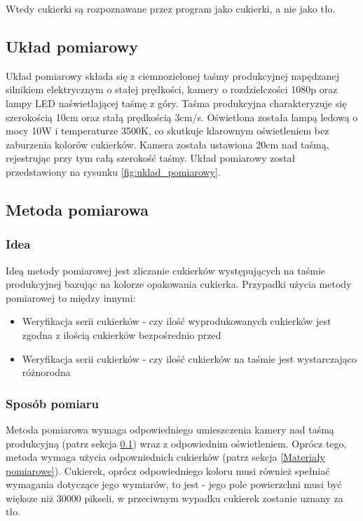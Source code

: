 \documentclass{article}
\begin{document}
Wtedy cukierki są rozpoznawane przez program jako cukierki, a nie jako tło.

\subsection{Układ pomiarowy}
\label{Układ pomiarowy}

Układ pomiarowy składa się z ciemnozielonej taśmy produkcyjnej napędzanej silnikiem elektrycznym o stałej prędkości, kamery o rozdzielczości 1080p oraz lampy LED naświetlającej taśmę z góry.
Taśma produkcyjna charakteryzuje się szerokością 10cm oraz stałą prędkością 3cm/s. Oświetlona została lampą ledową o mocy 10W i temperaturze 3500K, co skutkuje klarownym oświetleniem bez zaburzenia kolorów cukierków.
Kamera została ustawiona 20cm nad taśmą, rejestrując przy tym całą szerokość taśmy.
Układ pomiarowy został przedstawiony na rysunku \ref{fig:uklad_pomiarowy}.

\subsection{Metoda pomiarowa}
\label{Metoda pomiarowa}
\subsubsection{Idea}
\label{Idea}

Ideą metody pomiarowej jest zliczanie cukierków występujących na taśmie produkcyjnej bazując na kolorze opakowania cukierka. Przypadki użycia metody pomiarowej to między innymi:

\begin{itemize}
    \item Weryfikacja serii cukierków - czy ilość wyprodukowanych cukierków jest zgodna z ilością cukierków bezpośrednio przed
    \item Weryfikacja serii cukierków - czy ilość cukierków na taśmie jest wystarczająco różnorodna
\end{itemize}

\subsubsection{Sposób pomiaru}
\label{Sposób pomiaru}

Metoda pomiarowa wymaga odpowiedniego umieszczenia kamery nad taśmą produkcyjną (patrz sekcja \ref{Układ pomiarowy}) wraz z odpowiednim oświetleniem. Oprócz tego, metoda wymaga użycia odpowniednich cukierków (patrz sekcja \ref{Materiały pomiarowe}). Cukierek, oprócz odpowiedniego koloru musi również spełniać wymagania dotyczące jego wymiarów, to jest - jego pole powierzchni musi być większe niż 30000 pikseli, w przeciwnym wypadku cukierek zostanie uznany za tło.
\end{document}
